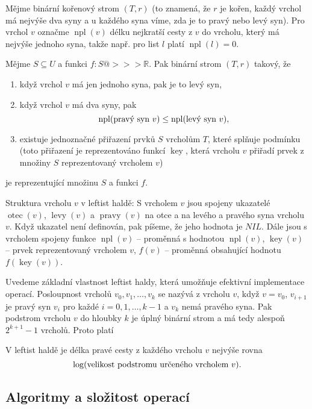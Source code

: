 \documentclass[a4paper,12pt]{article}
\def \emph#1{\underbar{#1}}
\DeclareMathOperator*{\otec}{otec}
\DeclareMathOperator*{\levy}{levy}
\DeclareMathOperator*{\pravy}{pravy}
\DeclareMathOperator*{\key}{key}
\DeclareMathOperator*{\npl}{npl}
\begin{document}
Mějme binární kořenový strom $(T,r)$ (to znamená, že $
r$ je kořen, 
každý vrchol má nejvýše dva syny a u každého syna 
víme, zda je to pravý nebo levý syn). Pro vrchol $v$ 
označme $\npl(v)$ délku nejkratší cesty z $v$ do vrcholu, který má 
nejvýše jednoho syna, takže např. pro list $l$ platí $\npl
(l)=0$. 

Mějme $S\subseteq U$ a funkci $f:S@>>>\mathbb R$. Pak binární strom 
$(T,r)$ takový, že
\begin{enumerate}
\item
když vrchol $v$ má jen jednoho syna, pak je to levý syn,
\item
když vrchol $v$ má dva syny, pak 
$$\npl(\text{\rm pravý syn }v)\le\npl(\text{\rm levý syn }v),$$
\item
existuje jednoznačné přiřazení prvků $S$  
vrcholům $T$, které splňuje podmínku  
(toto přiřazení 
je reprezentováno funkcí $\key$, která vrcholu $v$ přiřadí prvek 
z množi\-ny $S$ reprezentovaný vrcholem $v$)
\end{enumerate}
je \emph{leftist} \emph{halda} 
reprezentující množinu $S$ a funkci $f$. 

Struktura vrcholu $v$ v leftist haldě:\newline 
S vrcholem $v$ jsou 
spojeny ukazatelé $\otec(v)$, $\levy(v)$ a $\pravy(v)$ na otce a 
na levého a pravého syna vrcholu $v$.  
Když ukazatel není definován, pak píšeme, že jeho hodnota je 
$NIL$.  Dále jsou s vrcholem spojeny funkce\newline 
$\npl(v)$ -- proměnná s hodnotou $\npl(v)$,\newline 
$\key(v)$ -- prvek reprezentovaný vrcholem $v$,\newline 
$f(v)$ -- proměnná obsahující hodnotu $f(\key(v))$.

Uvedeme základní vlastnost leftist haldy, která 
umožňuje efektivní implementace operací. 
Posloupnost vrcholů $v_0,v_1,\dots,v_k$ se nazývá 
\emph{pravá} \emph{cesta} z vrcholu $v$, když $v=v_0$, $v_{i
+1}$ 
je pravý syn $v_i$ pro každé $i=0,1,\dots,k-1$ a $v_k$ nemá 
pravého syna. Pak podstrom vrcholu $v$ do hloubky $k$ je 
úplný binární strom a má tedy  
alespoň $2^{k+1}-1$ vrcholů. Proto platí 

\begin{tvrzeni}V leftist haldě je 
délka pravé cesty z každého vrcholu $v$ nejvýše rovna 
$$\log(\text{\rm velikost podstromu určeného vrcholem }v).$$
\end{tvrzeni}

\subsection{
Algoritmy a složitost operací
}
\end{document}
